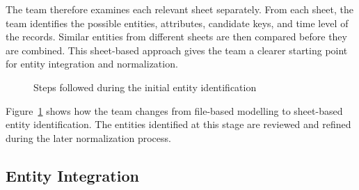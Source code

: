 The team therefore examines each relevant sheet separately. From each sheet,
the team identifies the possible entities, attributes, candidate keys, and
time level of the records. Similar entities from different sheets are then
compared before they are combined. This sheet-based approach gives the team a
clearer starting point for entity integration and normalization.
\begin{figure}[H]
    \centering


    \caption{Steps followed during the initial entity identification}
    \label{fig:initial-entity-identification}
\end{figure}
Figure~\ref{fig:initial-entity-identification} shows how the team changes from
file-based modelling to sheet-based entity identification. The entities
identified at this stage are reviewed and refined during the later
normalization process.

\subsection{Entity Integration }

